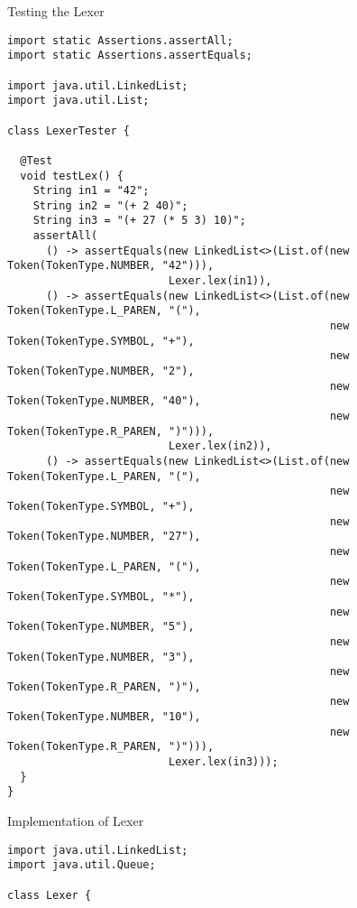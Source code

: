 \begin{verbnobox}[\footnotesize]
\begin{verbnobox}[\footnotesize]
\begin{verbnobox}[\footnotesize]
\begin{verbnobox}[\footnotesize]
\begin{cl}{Testing the Lexer}
\begin{lstlisting}[language=MyJava]
import static Assertions.assertAll;
import static Assertions.assertEquals;

import java.util.LinkedList;
import java.util.List;

class LexerTester {
  
  @Test
  void testLex() {
    String in1 = "42";
    String in2 = "(+ 2 40)";
    String in3 = "(+ 27 (* 5 3) 10)";
    assertAll(
      () -> assertEquals(new LinkedList<>(List.of(new Token(TokenType.NUMBER, "42"))),
                         Lexer.lex(in1)),
      () -> assertEquals(new LinkedList<>(List.of(new Token(TokenType.L_PAREN, "("),
                                                  new Token(TokenType.SYMBOL, "+"),
                                                  new Token(TokenType.NUMBER, "2"),
                                                  new Token(TokenType.NUMBER, "40"),
                                                  new Token(TokenType.R_PAREN, ")"))),
                         Lexer.lex(in2)),
      () -> assertEquals(new LinkedList<>(List.of(new Token(TokenType.L_PAREN, "("),
                                                  new Token(TokenType.SYMBOL, "+"),
                                                  new Token(TokenType.NUMBER, "27"),
                                                  new Token(TokenType.L_PAREN, "("),
                                                  new Token(TokenType.SYMBOL, "*"),
                                                  new Token(TokenType.NUMBER, "5"),
                                                  new Token(TokenType.NUMBER, "3"),
                                                  new Token(TokenType.R_PAREN, ")"),
                                                  new Token(TokenType.NUMBER, "10"),
                                                  new Token(TokenType.R_PAREN, ")"))),
                         Lexer.lex(in3)));
  }
}
\end{lstlisting}
\end{cl}

\begin{cl}{Implementation of Lexer}
\begin{lstlisting}[language=MyJava]
import java.util.LinkedList;
import java.util.Queue;

class Lexer {


\end{lstlisting}
\end{cl}
\end{verbnobox}
\end{verbnobox}
\end{verbnobox}
\end{verbnobox}
